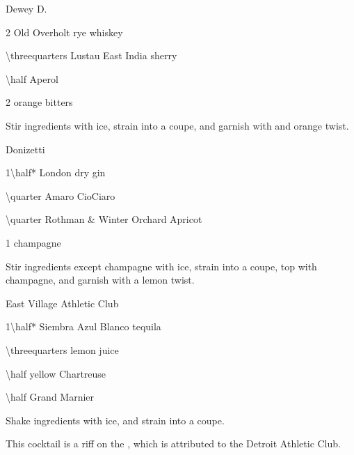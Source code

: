 \begin{PDTCocktail}{Dewey D.}
	\begin{Ingredients}
	\item \SI{2}{\oz} Old Overholt rye whiskey
	\item \SI{\threequarters}{\oz} Lustau East India sherry
	\item \SI{\half}{\oz} Aperol
	\item 2 \si{\dashes} orange bitters
	\end{Ingredients}
	
	\begin{Instructions}
	Stir ingredients with ice, strain into a coupe, and garnish with and orange twist.
	\end{Instructions}
\end{PDTCocktail}

\begin{PDTCocktail}{Donizetti}
	\begin{Ingredients}
	\item \SI{1\half*}{\oz} London dry gin
	\item \SI{\quarter}{\oz} Amaro CioCiaro
	\item \SI{\quarter}{\oz} Rothman \& Winter Orchard Apricot
	\item \SI{1}{\oz} champagne
	\end{Ingredients}
	
	\begin{Instructions}
	Stir ingredients except champagne with ice, strain into a coupe, top with champagne, and garnish with a lemon twist.
	\end{Instructions}
\end{PDTCocktail}

\begin{PDTCocktail}{East Village Athletic Club}
	\begin{Ingredients}
	\item \SI{1\half*}{\oz} Siembra Azul Blanco tequila
	\item \SI{\threequarters}{\oz} lemon juice
	\item \SI{\half}{\oz} yellow Chartreuse
	\item \SI{\half}{\oz} Grand Marnier
	\end{Ingredients}
	
	\begin{Instructions}
	Shake ingredients with ice, and strain into a coupe.
	
	This cocktail is a riff on the , which is attributed to the Detroit Athletic Club.
	\end{Instructions}
\end{PDTCocktail}

